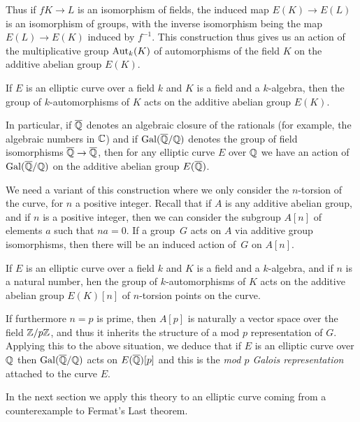  Thus if $f K\to L$ is an isomorphism of fields, the induced map $E(K)\to E(L)$ is an isomorphism of groups, with the inverse isomorphism being the map $E(L)\to E(K)$ induced by $f^{-1}$. This construction thus gives us an action of the multiplicative group $\operatorname{Aut}_k(K)$ of automorphisms of the field $K$ on the additive abelian group $E(K)$. 
 
\begin{definition}\label{EllipticCurve.galoisRepresentation}
  If $E$ is an elliptic curve over a field $k$ and $K$ is a field and a $k$-algebra,
  then the group of $k$-automorphisms of $K$ acts on the additive abelian group $E(K)$.
\end{definition}
 In particular, if $\overline{\mathbb{Q}}$ denotes an algebraic closure of the rationals (for example, the algebraic numbers in $\mathbb{C}$) and if $\operatorname{Gal}(\overline{\mathbb{Q}}/\mathbb{Q})$ denotes the group of field isomorphisms $\overline{\mathbb{Q}}\to\overline{\mathbb{Q}}$, then for any elliptic curve $E$ over $\mathbb{Q}$ we have an action of $\operatorname{Gal}(\overline{\mathbb{Q}}/\mathbb{Q})$ on the additive abelian group $E(\overline{\mathbb{Q}})$.

We need a variant of this construction where we only consider the $n$-torsion of the curve, for $n$ a positive integer. Recall that if $A$ is any additive abelian group, and if $n$ is a positive integer, then we can consider the subgroup $A[n]$ of elements $a$ such that $na=0$. If a group~$G$ acts on $A$ via additive group isomorphisms, then there will be an induced action of~$G$ on $A[n]$. 

\begin{definition}\label{EllipticCurve.torsionGaloisRepresentation}
  If $E$ is an elliptic curve over a field $k$ and $K$ is a field and a $k$-algebra,
  and if $n$ is a natural number, hen the group of $k$-automorphisms of $K$ acts on the additive abelian group $E(K)[n]$ of $n$-torsion points on the curve.
\end{definition}

If furthermore $n=p$ is prime, then $A[p]$ is naturally a vector space over the field $\mathbb{Z}/p\mathbb{Z}$, and thus it inherits the structure of a mod $p$ representation of $G$. Applying this to the above situation, we deduce that if $E$ is an elliptic curve over $\mathbb{Q}$ then $\operatorname{Gal}(\overline{\mathbb{Q}}/\mathbb{Q})$ acts on $E(\overline{\mathbb{Q}})[p]$ and this is the \emph{mod $p$ Galois representation} attached to the curve $E$.

In the next section we apply this theory to an elliptic curve coming from a counterexample to Fermat's Last theorem.

